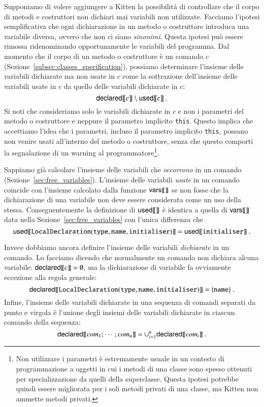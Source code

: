 Supponiamo di volere aggiungere a Kitten la possibilit\`a di controllare
che il corpo di metodi e costruttori non dichiari mai variabili non utilizzate.
Facciamo l'ipotesi semplificativa che ogni dichiarazione in un metodo o
costruttore introduca una variabile diversa, ovvero che non ci siano
\emph{sinonimi}. Questa ipotesi pu\`o essere rimossa ridenominando
opportunamente le variabili del programma.
Dal momento che il corpo di un metodo o costruttore \`e un comando $c$
(Sezione~\ref{subsec:classes_specification}), possiamo determinare l'insieme
delle variabili dichiarate ma non usate in $c$ come la sottrazione dell'insieme
delle variabili usate in $c$ da quello delle variabili dichiarate in $c$:
\[
  {\mathsf{declared}[\![{c}]\!]}\setminus{\mathsf{used}[\![{c}]\!]}~.
\]
Si noti che consideriamo solo le variabili dichiarate in $c$ e non
i parametri del metodo o costruttore e neppure il parametro implicito
\texttt{this}.
Questo implica che accettiamo l'idea che i parametri,
incluso il parametro implicito \texttt{this}, possano non venire usati
all'interno del metodo o costruttore, senza che questo comporti la segnalazione
di un warning al programmatore\footnote{Non utilizzare i parametri \`e
estremamente usuale in un contesto di programmazione a oggetti in cui i metodi
di una classe sono
spesso ottenuti per specializzazione da quelli della superclasse. Questa
ipotesi potrebbe quindi essere migliorata per i soli metodi privati di una
classe, ma Kitten non ammette metodi privati.}.

Sappiamo gi\`a calcolare l'insieme delle variabili che \emph{occorrono}
in un comando (Sezione~\ref{sec:free_variables}). L'insieme delle variabili
\emph{usate} in un comando coincide con l'insieme calcolato dalla funzione
${\mathsf{vars}[\![{}]\!]}$ se non fosse che la dichiarazione di una variabile non deve essere
considerata come un uso della stessa. Conseguentemente la definizione
di ${\mathsf{used}[\![{}]\!]}$ \`e identica a quella di ${\mathsf{vars}[\![{}]\!]}$ data nella
Sezione~\ref{sec:free_variables} con l'unica differenza che
\[
  {\mathsf{used}[\![{\mathtt{LocalDeclaration(type,name,initialiser)}}]\!]}
    ={\mathsf{used}[\![{\mathtt{initialiser}}]\!]}~.
\]

Invece dobbiamo ancora definire l'insieme delle variabili
\emph{dichiarate} in un comando. Lo facciamo dicendo che normalmente un
comando non dichiara alcuna variabile:
%
$
  {\mathsf{declared}[\![{\mathit{c}}]\!]}=\emptyset
$,
%
ma la dichiarazione di variabile fa ovviamente eccezione alla regola
generale:
%
\[
  {\mathsf{declared}[\![{\mathtt{LocalDeclaration(type,name,initialiser)}}]\!]}
    =\{\mathtt{name}\}~.
\]
%
Infine, l'insieme delle variabili dichiarate in una sequenza di comandi
separati da punto e virgola \`e l'unione degli insiemi delle variabili
dichiarate in ciascun comando della sequenza:
%
\[
  {\mathsf{declared}[\![{\mathit{com}_1;\cdots;\mathit{com}_n}]\!]}
    =\cup_{i=1}^n{\mathsf{declared}[\![{\mathit{com}_i}]\!]}~.
\]

